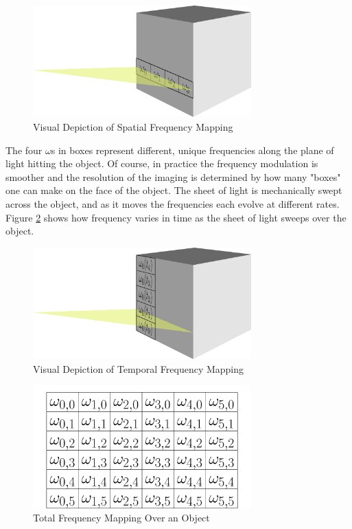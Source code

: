 \documentclass[12pt]{article}
\begin{document}
\begin{figure}[ht]
	\centering
	\includegraphics[width=0.75\textwidth]{spifi-line-on-cube.png}
	\caption{Visual Depiction of Spatial Frequency Mapping}
	\label{fig:cube-line}
\end{figure}

The four $\omega$s in boxes represent different, unique frequencies along the plane of light hitting the object. Of course, in practice the frequency modulation is smoother and the resolution of the imaging is determined by how many "boxes" one can make on the face of the object. The sheet of light is mechanically swept across the object, and as it moves the frequencies each evolve at different rates. Figure \ref{fig:cube-sheet} shows how frequency varies in time as the sheet of light sweeps over the object.

\begin{figure}[ht]
	\centering
	\includegraphics[width=0.75\textwidth]{spifi-sheet-on-cube}
	\caption{Visual Depiction of Temporal Frequency Mapping}
	\label{fig:cube-sheet}
\end{figure}



\begin{figure}[ht]
\centering
\includegraphics[width=0.75\textwidth]{spifi-grid.png}
\caption{Total Frequency Mapping Over an Object\label{fig:mapping-diagram}}
\end{figure}
\end{document}
